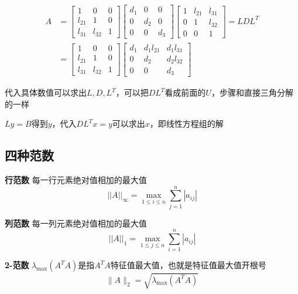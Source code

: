 \[
\begin{aligned}
    A
    &= 
    \left[
    \begin{array}{ccc}
        1 & 0 & 0 \\
        l_{21} & 1 & 0 \\
        l_{31} & l_{32} & 1
    \end{array}
    \right]
    \left[
    \begin{array}{ccc}
        d_{1} & 0 & 0 \\
        0 & d_{2} &0 \\
        0 & 0 & d_{3}
    \end{array}
    \right]
    \left[
    \begin{array}{ccc}
        1 & l_{21} & l_{31} \\
        0 & 1 & l_{32} \\
        0 & 0 & 1
    \end{array}
    \right] 
    =LDL^T \\
    &=
    \left[
    \begin{array}{ccc}
        1 & 0 & 0 \\
        l_{21} & 1 & 0 \\
        l_{31} & l_{32} & 1
    \end{array}
    \right]
    \left[
    \begin{array}{ccc}
        d_{1} & d_{1}l_{21} & d_{1}l_{31} \\
        0 & d_{2} & d_{2}l_{32} \\
        0 & 0 & d_{3}
    \end{array}
    \right]
\end{aligned}
\]

代入具体数值可以求出$L,D,L^T$，可以把$DL^T$看成前面的$U$，步骤和直接三角分解的一样

$Ly=B$得到$y$，代入$DL^Tx=y$可以求出$x$，即线性方程组的解

\subsection{四种范数}\label{fanshu}

\textbf{行范数} \quad 每一行元素绝对值相加的最大值
    \[
    ||A||_{\infty}=\max_{1 \leq i \leq n} \sum_{j=1}^{n} |a_{ij}|
    \]

    
\textbf{列范数} \quad 每一列元素绝对值相加的最大值
    \[
    ||A||_{1}=\max_{1 \leq j \leq n} \sum_{i=1}^{n} |a_{ij}|
    \]

\textbf{2-范数} \quad $\lambda_{\max}(A^T A)$是指$A^T A$特征值最大值，也就是特征值最大值开根号
    \[
    \|A\|_2 = \sqrt{\lambda_{\max}(A^T A)}
    \]

